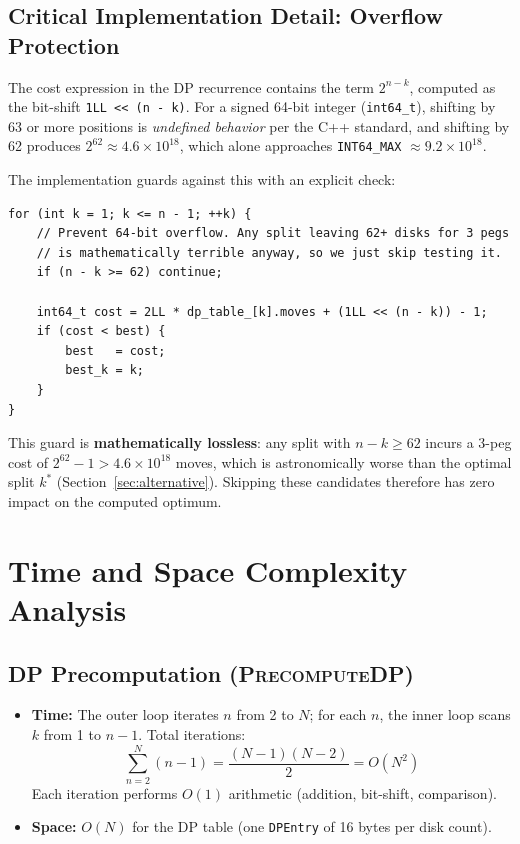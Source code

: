 \documentclass[12pt, a4paper]{article}
\begin{document}
\subsection{Critical Implementation Detail: Overflow Protection}
\label{sec:overflow}

The cost expression in the DP recurrence contains the term $2^{n-k}$, computed as the bit-shift \texttt{1LL << (n - k)}.
For a signed 64-bit integer (\texttt{int64\_t}), shifting by 63 or more positions is \emph{undefined behavior} per the C++ standard, and shifting by 62 produces $2^{62} \approx 4.6 \times 10^{18}$, which alone approaches \texttt{INT64\_MAX} $\approx 9.2 \times 10^{18}$.

The implementation guards against this with an explicit check:

\begin{lstlisting}[style=cpp, caption={Overflow guard in DP computation (solver.h)}]
for (int k = 1; k <= n - 1; ++k) {
    // Prevent 64-bit overflow. Any split leaving 62+ disks for 3 pegs
    // is mathematically terrible anyway, so we just skip testing it.
    if (n - k >= 62) continue;

    int64_t cost = 2LL * dp_table_[k].moves + (1LL << (n - k)) - 1;
    if (cost < best) {
        best   = cost;
        best_k = k;
    }
}
\end{lstlisting}

This guard is \textbf{mathematically lossless}: any split with $n - k \geq 62$ incurs a 3-peg cost of $2^{62} - 1 > 4.6 \times 10^{18}$ moves, which is astronomically worse than the optimal split $k^*$ (Section~\ref{sec:alternative}).
Skipping these candidates therefore has zero impact on the computed optimum.


\section{Time and Space Complexity Analysis}
\label{sec:complexity}

\subsection{DP Precomputation (\textsc{PrecomputeDP})}

\begin{itemize}[leftmargin=2em]
    \item \textbf{Time:} The outer loop iterates $n$ from 2 to $N$; for each $n$, the inner loop scans $k$ from 1 to $n - 1$. Total iterations:
    \[
        \sum_{n=2}^{N} (n - 1) = \frac{(N-1)(N-2)}{2} = O(N^2)
    \]
    Each iteration performs $O(1)$ arithmetic (addition, bit-shift, comparison).

    \item \textbf{Space:} $O(N)$ for the DP table (one \texttt{DPEntry} of 16 bytes per disk count).
\end{itemize}
\end{document}

